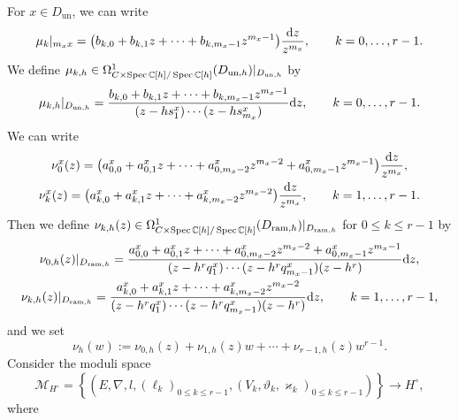 \documentclass[pdftex]{sigma}
\numberwithin{equation}{section}
\newcommand\Spec{\mathop{\rm Spec}\nolimits}
\begin{document}
For $x\in D_{\mathrm{un}}$, we can write
\[
 \mu_k|_{m_xx}
 =
 \big(b_{k,0}+b_{k,1}z+\cdots+b_{k,m_x-1}z^{m_x-1}\big)\frac{{\rm d}z}{z^{m_x}},
 \qquad k=0,\dots,r-1.
\]
We define
$\mu_{k,h}\in\Omega^1_{C\times\Spec\mathbb{C}[h]/\Spec\mathbb{C}[h]}
(D_{\mathrm{un},h})|_{D_{\mathrm{un},h}}$ by
\[
 \mu_{k,h}|_{D_{\mathrm{un},h}}
 =
 \frac{b_{k,0}+b_{k,1}z+\cdots+b_{k,m_x-1}z^{m_x-1}} {(z-hs^x_1)\cdots(z-hs^x_{m_x})} {\rm d}z,
 \qquad k=0,\dots,r-1.
\]
We can write
\begin{gather*}
 \nu^x_0(z)
 =
 \big(a^x_{0,0}+a^x_{0,1}z+\cdots+a^x_{0,m_x-2}z^{m_x-2}+a^x_{0,m_x-1}z^{m_x-1}\big)\frac{{\rm d}z}{z^{m_x}},
 \\
 \nu^x_k(z)
 =
 \big(a^x_{k,0}+a^x_{k,1}z+\cdots+a^x_{k,m_x-2}z^{m_x-2}\big)\frac{{\rm d}z}{z^{m_x}},
 \qquad k=1,\dots,r-1 .
\end{gather*}
Then we define
$\nu_{k,h}(z)\in\Omega^1_{C\times\Spec\mathbb{C}[h]/\Spec\mathbb{C}[h]}
(D_{\mathrm{ram},h}) |_{D_{\mathrm{ram},h}}$
for $0\leq k\leq r-1$ by
\begin{gather*}
 \nu_{0,h}(z) |_{D_{\mathrm{ram},h}}
 =
 \frac{a^x_{0,0}+a^x_{0,1}z+\cdots+a^x_{0,m_x-2}z^{m_x-2}+a^x_{0,m_x-1}z^{m_x-1}}
 {(z-h^rq^x_1)\cdots(z-h^rq^x_{m_x-1})(z-h^r)} {\rm d}z,
 \\
 \nu_{k,h}(z) |_{D_{\mathrm{ram},h}}
 =
 \frac{a^x_{k,0}+a^x_{k,1}z+\cdots+a^x_{k,m_x-2}z^{m_x-2}}
 {(z-h^rq^x_1)\cdots(z-h^rq^x_{m_x-1})(z-h^r)} {\rm d}z,
 \qquad k=1,\dots,r-1,
\end{gather*}
and we set
\[
 \nu_h(w)
 :=
 \nu_{0,h}(z)+\nu_{1,h}(z)w+\cdots+\nu_{r-1,h}(z)w^{r-1}.
\]
Consider the moduli space
\[
 {\mathcal M}_{H^{\circ}}
 =\left\{
 (E,\nabla, l,(\ell_k)_{0\leq k\leq r-1},(V_k,\vartheta_k,\varkappa_k)_{0\leq k\leq r-1})
 \right\}
 \longrightarrow H^{\circ},
\]
where
\end{document}
